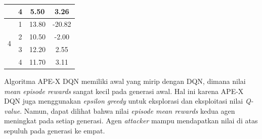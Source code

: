\begin{table}[H]
\begin{tabular}{|c|c|c|c|}
                                                                              & 4                                                                            & 5.50                                                                                                  & 3.26                                                                                                  \\ \hline
  \multirow{4}{*}{4}                                                           & 1                                                                            & 13.80                                                                                                 & -20.82                                                                                                \\ \cline{2-4} 
                                                                              & 2                                                                            & 10.50                                                                                                 & -2.00                                                                                                 \\ \cline{2-4} 
                                                                              & 3                                                                            & 12.20                                                                                                 & 2.55                                                                                                  \\ \cline{2-4} 
                                                                              & 4                                                                            & 11.70                                                                                                 & 3.11                                                                                                  \\ \hline
  \end{tabular}
\end{table}

Algoritma APE-X DQN memiliki awal yang mirip dengan DQN, dimana nilai \emph{mean episode rewards} sangat kecil pada generasi awal.
Hal ini karena APE-X DQN juga menggunakan \emph{epsilon greedy} untuk eksplorasi dan eksploitasi nilai \emph{Q-value}.
Namun, dapat dilihat bahwa nilai \emph{episode mean rewards} kedua agen meningkat pada setiap generasi.
Agen \emph{attacker} mampu mendapatkan nilai di atas sepuluh pada generasi ke empat.

